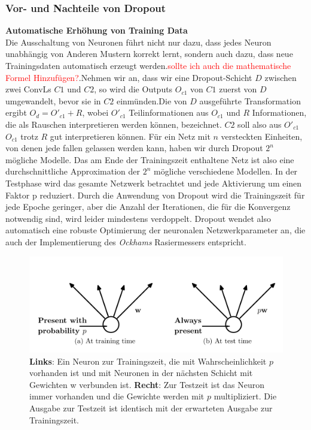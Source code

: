 \documentclass[12pt,a4paper]{scrartcl}
\numberwithin{equation}{section}
\begin{document}
\subsubsection{Vor- und Nachteile von Dropout}
\textbf{Automatische Erhöhung von Training Data }\\
Die Ausschaltung von Neuronen führt nicht nur dazu, dass jedes Neuron unabhängig von Anderen Mustern korrekt lernt, sondern auch dazu, dass neue Trainingsdaten automatisch erzeugt werden.\textcolor{red}{sollte ich auch die mathematische Formel Hinzufügen?}.Nehmen wir an, dass wir eine Dropout-Schicht $ D $  zwischen zwei \acsp{ConvL}  $ C1 $ und $ C2 $, so wird die Outputs $ O_{c1} $ von $ C1 $ zuerst von $ D $ umgewandelt, bevor sie in $ C2 $ einmünden.Die von $ D $ ausgeführte Transformation ergibt $ O_d = O'_{c1} +R $, wobei $ O'_{c1} $ Teilinformationen aus $ O_{c1} $  und $ R $  Informationen, die als Rauschen interpretieren werden können, bezeichnet. $ C2 $ soll also aus       $ O'_{c1} $ $ O_{c1} $ trotz $ R $ gut interpretieren können.
Für ein Netz mit $ n $ versteckten Einheiten, von denen jede fallen gelassen werden kann, haben wir durch Dropout $ 2^n $ mögliche Modelle. Das am Ende der Trainingszeit enthaltene Netz ist also eine durchschnittliche Approximation der $ 2^n $ mögliche verschiedene Modellen. In der Testphase wird das gesamte Netzwerk betrachtet und jede Aktivierung um einen Faktor p reduziert.
Durch die Anwendung von Dropout wird die Trainingszeit für jede Epoche geringer, aber die Anzahl der Iterationen, die für die Konvergenz notwendig sind, wird leider mindestens verdoppelt.
Dropout wendet also automatisch eine robuste Optimierung der neuronalen Netzwerkparameter an, die auch der Implementierung des \textit{Ockhams} Rasiermessers entspricht.

 \begin{figure}
	\centering
	\includegraphics[width=\textwidth , height=0.3\linewidth]{dropout_}
	\caption{ \textbf{Links}: Ein Neuron zur Trainingszeit, die mit Wahrscheinlichkeit $ p $ vorhanden ist und mit Neuronen in der nächsten Schicht mit Gewichten w verbunden ist. 
		\textbf{Recht}: Zur Testzeit ist das Neuron immer vorhanden und die Gewichte werden mit $ p $ multipliziert. 
		Die Ausgabe zur Testzeit ist identisch mit der erwarteten Ausgabe zur Trainingszeit\cite{3}.}
	\label{fig:Dropout_}
\end{figure}
\end{document}
